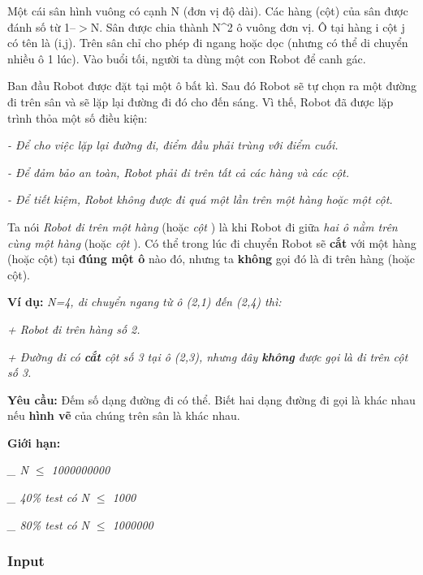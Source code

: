 



   Một cái sân hình vuông có cạnh N (đơn vị độ dài). Các hàng (cột) của sân được đánh số từ 1--$>$N. Sân được chia thành N\textasciicircum2 ô vuông đơn vị. Ô tại hàng i cột j có tên là (i,j). Trên sân chỉ cho phép đi ngang hoặc dọc (nhưng có thể di chuyển nhiều ô 1 lúc). Vào buổi tối, người ta dùng một con Robot để canh gác.  

   Ban đầu Robot được đặt tại một ô bất kì. Sau đó Robot sẽ tự chọn ra một đường đi trên sân và sẽ lặp lại đường đi đó cho đến sáng. Vì thế, Robot đã được lặp trình thỏa một số điều kiện:  

\emph{    - Để cho việc lặp lại đường đi, điểm đầu phải trùng với điểm cuối.   }

\emph{    - Để đảm bảo an toàn, Robot phải đi trên tất cả các hàng và các cột.    
\\}

\emph{    - Để tiết kiệm, Robot không được đi quá một lần trên một hàng hoặc một cột.   }

   Ta nói   \emph{    Robot đi trên một hàng   }   (hoặc   \emph{    cột   }   ) là khi Robot đi giữa   \emph{    hai ô nằm trên cùng một hàng   }   (hoặc   \emph{    cột   }   ). Có thể trong lúc đi chuyển Robot sẽ   \textbf{    cắt   }   với một hàng (hoặc cột) tại   \textbf{    đúng một ô   }   nào đó, nhưng ta   \textbf{    không   }   gọi đó là đi trên hàng (hoặc cột).  

\textbf{     Ví dụ:    }\emph{    N=4, di chuyển ngang từ ô (2,1) đến (2,4) thì:   }

\emph{    + Robot đi trên hàng số 2.   }

\emph{    + Đường đi có    \textbf{     cắt    }    cột số 3 tại ô (2,3), nhưng đây    \textbf{     không    }    được gọi là đi trên cột số 3.   }

\textbf{      Yêu cầu:     }   Đếm số dạng đường đi có thể. Biết hai dạng đường đi gọi là khác nhau nếu   \textbf{    hình vẽ   }   của chúng trên sân là khác nhau.  

\textbf{      Giới hạn:     }

\emph{    \_ N $\le$ 1000000000   }

\emph{    \_ 40\% test có N $\le$ 1000   }

\emph{    \_ 80\% test có N $\le$ 1000000   }

\subsubsection{   Input  }

